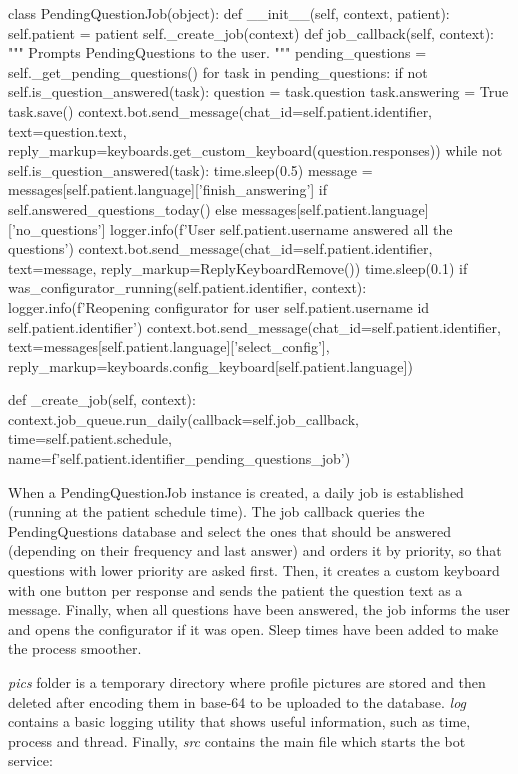 \documentclass[12pt,english]{article}
\begin{document}
\begin{python}[caption={PendingQuestion job}, captionpos=b]
class PendingQuestionJob(object):
  def __init__(self, context, patient):
      self.patient = patient
      self._create_job(context)
  def job_callback(self, context):
      """
      Prompts PendingQuestions to the user.
      """
      pending_questions = self._get_pending_questions()
      for task in pending_questions:
          if not self.is_question_answered(task):
              question = task.question
              task.answering = True
              task.save()
              context.bot.send_message(chat_id=self.patient.identifier, text=question.text, reply_markup=keyboards.get_custom_keyboard(question.responses))
              while not self.is_question_answered(task):
                  time.sleep(0.5)
      message = messages[self.patient.language]['finish_answering'] if self.answered_questions_today() else messages[self.patient.language]['no_questions']
      logger.info(f'User {self.patient.username} answered all the questions')
      context.bot.send_message(chat_id=self.patient.identifier, text=message, reply_markup=ReplyKeyboardRemove())
      time.sleep(0.1)
      if was_configurator_running(self.patient.identifier, context):
          logger.info(f'Reopening configurator for user {self.patient.username} id {self.patient.identifier}')
          context.bot.send_message(chat_id=self.patient.identifier,  text=messages[self.patient.language]['select_config'], reply_markup=keyboards.config_keyboard[self.patient.language])

  def _create_job(self, context):
      context.job_queue.run_daily(callback=self.job_callback, time=self.patient.schedule, name=f'{self.patient.identifier}_pending_questions_job')
\end{python}

When a PendingQuestionJob instance is created, a daily job is established (running at the patient schedule time). The job callback queries the PendingQuestions database and select the ones that should be answered (depending on their frequency and last answer) and orders it by priority, so that questions with lower priority are asked first. Then, it creates a custom keyboard with one button per response and sends the patient the question text as a message. Finally, when all questions have been answered, the job informs the user and opens the configurator if it was open. Sleep times have been added to make the process smoother.


\emph{pics} folder is a temporary directory where profile pictures are stored and then deleted after encoding them in base-64 to be uploaded to the database. \emph{log} contains a basic logging utility that shows useful information, such as time, process and thread. Finally, \emph{src} contains the main file which starts the bot service:
\end{document}
